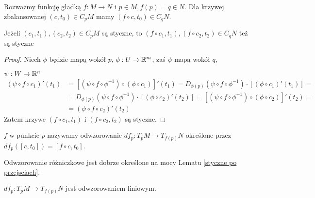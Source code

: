 Rozważmy funkcję gładką $f:M\to N$ i $p\in M,f(p)=q\in N$. Dla krzywej zbalansowanej $(c, t_0)\in C_pM$ mamy $(f\circ c, t_0)\in C_qN$.

\begin{lemma} \label{styczne po przejsciach}
  Jeżeli $(c_1, t_1),(c_2, t_2)\in C_pM$ są styczne, to $(f\circ c_1, t_1),(f\circ c_2, t_2)\in C_qN$ też są styczne
\end{lemma}

\begin{proof}
  Niech $\phi$ będzie mapą wokół $p$, $\phi:U\to\mathbb{R}^m$, zaś $\psi$ mapą wokół $q$,

  $\psi:W\to\mathbb{R}^n$
  \begin{align*}(\psi\circ f\circ c_1)'(t_1)&=[(\psi\circ f\circ\phi^{-1})\circ(\phi\circ c_1)]'(t_1)=D_{\phi(p)}(\psi\circ f\circ \phi^{-1})\cdot[(\phi\circ c_1)'(t_1)]=\\
  &=D_{\phi(p)}(\psi\circ f\circ\phi^{-1})\cdot[(\phi\circ c_2)'(t_2)]=[(\psi\circ f\circ\phi^{-1})\circ(\phi\circ c_2)]'(t_2)=\\
  &=(\psi\circ f\circ c_2)'(t_2)\end{align*}
  Zatem krzywe $(f\circ c_1, t_1)$ i $(f\circ c_2, t_2)$ są styczne.
\end{proof}

\begin{definition}[różniczka]  $f$ w punkcie $p$ nazywamy odwzorowanie $df_p:T_pM\to T_{f(p)}N$ określone przez $df_p([c, t_0])=[f\circ c, t_0]$.
\end{definition}

Odwzorowanie różniczkowe jest dobrze określone na mocy Lematu \ref{styczne po przejsciach}.

\begin{lemma}
  $df_p:T_pM\to T_{f(p)}N$ jest odwzorowaniem liniowym.
\end{lemma}

